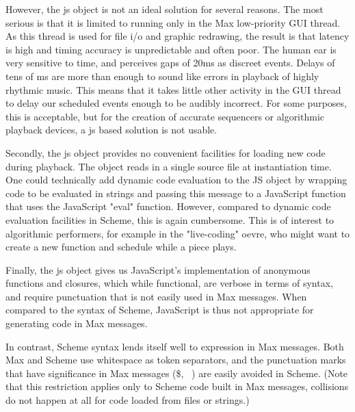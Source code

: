 \documentclass[acmsmall]{acmart}
\begin{document}
However, the js object is not an ideal solution for several reasons. The most serious
is that it is limited to running only in the Max low-priority GUI thread. As this
thread is used for file i/o and graphic redrawing, the result is that latency
is high and timing accuracy is unpredictable and often poor.
The human ear is very sensitive to time, and perceives gaps of 20ms as discreet
events. Delays of tens of ms are more than enough to sound like errors in playback
of highly rhythmic music. This means that it takes little other activity in the
GUI thread to delay our scheduled events enough to be audibly incorrect. 
For some purposes, this is acceptable, but for the creation of accurate 
sequencers or algorithmic playback devices, a js based solution is not usable.

Secondly, the js object provides no convenient facilities for loading new code
during playback. The object reads in a single source file at instantiation time.
One could technically add dynamic code evaluation to the JS object by wrapping
code to be evaluated in strings and passing this message to a JavaScript function
that uses the JavaScript "eval" function. However, compared to dynamic code
evaluation facilities in Scheme, this is again cumbersome. This is of interest
to algorithmic performers, for example in the "live-coding" oevre, who might
want to create a new function and schedule while a piece plays.

Finally, the js object gives us JavaScript's implementation of anonymous functions
and closures, which while functional, are verbose in terms of syntax, and require
punctuation that is not easily used in Max messages. When compared to the syntax
of Scheme, JavaScript is thus not appropriate for generating code in Max messages.

In contrast, Scheme syntax lends itself well to expression in Max messages. 
Both Max and Scheme use whitespace as token separators, and the punctuation marks
that have significance in Max messages (\$, \, \;) are easily avoided in Scheme.
(Note that this restriction applies only to Scheme code built in Max messages, collisions
do not happen at all for code loaded from files or strings.)
\end{document}
